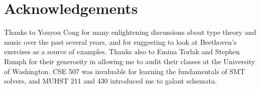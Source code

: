 \documentclass[sigplan,screen]{acmart}
\begin{document}
\section*{Acknowledgements}

Thanks to Youyou Cong for many enlightening discussions about type
theory and music over the past several years, and for suggesting to
look at Beethoven's exercises as a source of examples. Thanks also to
Emina Torlak and Stephen Rumph for their generosity in allowing me to
audit their classes at the University of Washington. CSE 507 was
invaluable for learning the fundamentals of SMT 
solvers, and MUHST 211 and 430 introduced me to galant schemata.


\end{document}
